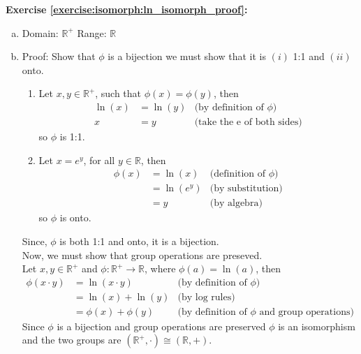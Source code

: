 \noindent\textbf{Exercise \ref{exercise:isomorph:ln_isomorph_proof}:}
\begin{enumerate}[(a)]
\item
Domain: ${\mathbb R}^+$  Range: ${\mathbb R}$

\item
Proof: Show that $\phi$ is a bijection we must show that it is $(i)$ 1:1 and $(ii)$ onto.
	\begin{enumerate}[($i$)]
	\item
	Let $x, y \in {\mathbb R}^+$, such that $\phi(x) = \phi(y)$, then
	\begin{align*}
	\ln(x) &= \ln(y) &\text{(by definition of\ } \phi)
	\\
	x &= y &\text{(take the e of both sides)}
	\end{align*}
	so $\phi$ is 1:1.

	\item
	Let $x = e^y$, for all $y \in {\mathbb R}$, then
	\begin{align*}
	\phi(x) &= \ln(x) &\text{(definition of\ } \phi)
	\\
	&= \ln(e^y) &\text{(by substitution)}
	\\
	&= y &\text{(by algebra)}
	\end{align*}
	so $\phi$ is onto.
	\end{enumerate}

	Since, $\phi$ is both 1:1 and onto, it is a bijection. 
	\\
	Now, we must show that group operations are preseved.
	\\
	Let $x, y \in {\mathbb R}^+$ and $\phi: {\mathbb R}^+ \rightarrow {\mathbb R}$, where $\phi(a) = \ln(a)$, then
	\\
	\begin{align*}
	\phi(x \cdot y) &= \ln(x \cdot y) &\text{(by definition of\ } \phi)
	\\
	&= \ln(x) + \ln(y) &\text{(by log rules)}
	\\
	&= \phi(x) + \phi(y) &\text{(by definition of\ } \phi \text{\ and group operations)}
	\end{align*}
	Since $\phi$ is a bijection and group operations are preserved $\phi$ is an isomorphism and the two groups are $({\mathbb R}^+, \cdot) \cong ({\mathbb R}, +)$.
	
\end{enumerate}

